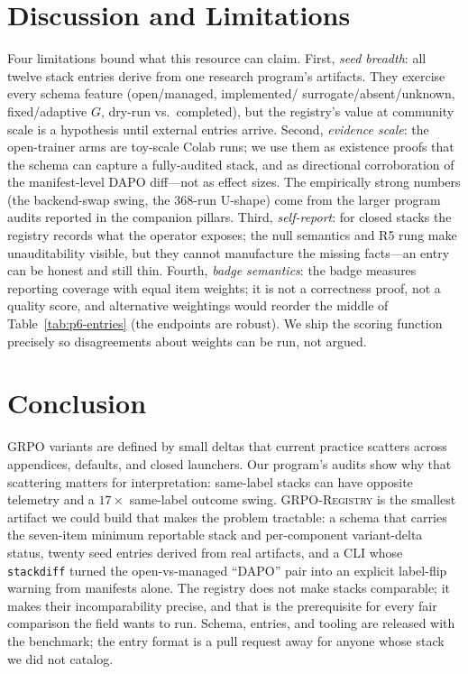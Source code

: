 \section{Discussion and Limitations}
\label{sec:p6-discussion}
Four limitations bound what this resource can claim. First, \emph{seed
breadth}: all twelve stack entries derive from one research program's
artifacts. They exercise every schema feature (open/managed, implemented/
surrogate/absent/unknown, fixed/adaptive $G$, dry-run vs.\ completed), but the
registry's value at community scale is a hypothesis until external entries
arrive. Second, \emph{evidence scale}: the open-trainer arms are toy-scale
Colab runs; we use them as existence proofs that the schema can capture a
fully-audited stack, and as directional corroboration of the manifest-level
DAPO diff---not as effect sizes. The empirically strong numbers (the
backend-swap swing, the 368-run U-shape) come from the larger program audits
reported in the companion pillars. Third, \emph{self-report}: for closed
stacks the registry records what the operator exposes; the null semantics and
R5 rung make unauditability visible, but they cannot manufacture the missing
facts---an entry can be honest and still thin. Fourth, \emph{badge
semantics}: the badge measures reporting coverage with equal item weights; it
is not a correctness proof, not a quality score, and alternative weightings
would reorder the middle of Table~\ref{tab:p6-entries} (the endpoints are
robust). We ship the scoring function precisely so disagreements about
weights can be run, not argued.

\section{Conclusion}
\label{sec:p6-conclusion}
GRPO variants are defined by small deltas that current practice scatters
across appendices, defaults, and closed launchers. Our program's audits show
why that scattering matters for interpretation: same-label stacks can have
opposite telemetry and a $17\times$ same-label outcome swing.
\textsc{GRPO-Registry} is the smallest artifact we could build that makes the
problem tractable: a schema that
carries the seven-item minimum reportable stack and per-component
variant-delta status, twenty seed entries derived from real artifacts, and a
CLI whose \texttt{stackdiff} turned the open-vs-managed ``DAPO'' pair into an
explicit label-flip warning from manifests alone. The registry does not make
stacks comparable; it makes their incomparability precise, and that is the
prerequisite for every fair comparison the field wants to run. Schema,
entries, and tooling are released with the benchmark; the entry format is a
pull request away for anyone whose stack we did not catalog.
